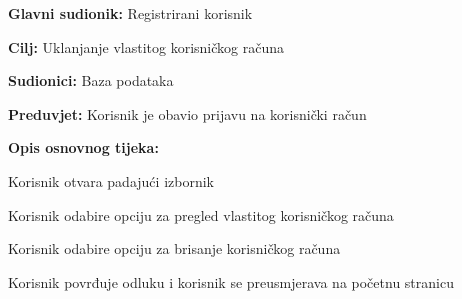 \noindent {}
\begin{packed_item}

	\item \textbf{Glavni sudionik: }Registrirani korisnik
	\item  \textbf{Cilj:} Uklanjanje vlastitog korisničkog računa
	\item  \textbf{Sudionici:} Baza podataka
	\item  \textbf{Preduvjet:} Korisnik je obavio prijavu na korisnički račun
	\item  \textbf{Opis osnovnog tijeka:}

	\item[] \begin{packed_enum}

		\item Korisnik otvara padajući izbornik
		\item Korisnik odabire opciju za pregled vlastitog korisničkog računa
		\item Korisnik odabire opciju za brisanje korisničkog računa
		\item Korisnik povrđuje odluku i korisnik se preusmjerava na početnu stranicu
	\end{packed_enum}
\end{packed_item}


